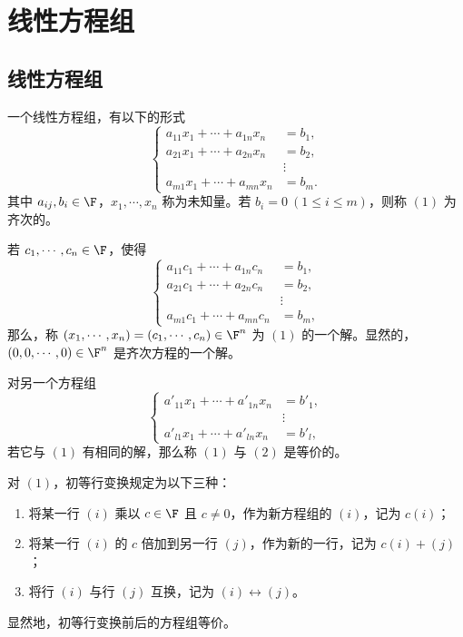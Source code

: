 \setchapterintro{}
\chapter{线性方程组}

\section{线性方程组}
\begin{definition}
	一个线性方程组，有以下的形式
	\begin{equation}\tag{1}
		\left\{
		\begin{aligned}
			a_{11}x_1+\cdots+a_{1n}x_n&=b_1,\\
			a_{21}x_1+\cdots+a_{2n}x_n&=b_2,\\
			&\vdots\\
			a_{m1}x_1+\cdots+a_{mn}x_n&=b_m.
		\end{aligned}
		\right.
	\end{equation}
	其中 $a_{ij},b_i\in\F$，$x_1,\cdots,x_n$ 称为未知量。若 $b_i=0\ (1\leq i\leq m)$，则称 $(1)$ 为齐次的。
	
	若 $c_1,\cdots,c_n\in\F$，使得
	\[
	\left\{
	\begin{aligned}
		a_{11}c_1+\cdots+a_{1n}c_n&=b_1,\\
		a_{21}c_1+\cdots+a_{2n}c_n&=b_2,\\
		&\vdots\\
		a_{m1}c_1+\cdots+a_{mn}c_n&=b_m,
	\end{aligned}
	\right.
	\]
	那么，称 $(x_1,\cdots,x_n)=(c_1,\cdots,c_n)\in\F^n$ 为 $(1)$ 的一个解。显然的，$(0,0,\cdots,0)\in\F^n$ 是齐次方程的一个解。
	
	对另一个方程组
	\begin{equation}\tag{2}
		\left\{
		\begin{aligned}
			a'_{11}x_1+\cdots+a'_{1n}x_n&=b'_1,\\
			&\vdots\\
			a'_{l1}x_1+\cdots+a'_{ln}x_n&=b'_l,
		\end{aligned}
		\right.
	\end{equation}
	若它与 $(1)$ 有相同的解，那么称 $(1)$ 与 $(2)$ 是等价的。
\end{definition}

\begin{definition}
	对 $(1)$，初等行变换规定为以下三种：
	\begin{enumerate}
		\item 将某一行 $(i)$ 乘以 $c\in\F$ 且 $c\neq0$，作为新方程组的 $(i)$，记为 $c(i)$；
		\item 将某一行 $(i)$ 的 $c$ 倍加到另一行 $(j)$，作为新的一行，记为 $c(i)+(j)$；
		\item 将行 $(i)$ 与行 $(j)$ 互换，记为 $(i)\leftrightarrow(j)$。
	\end{enumerate}
	
\end{definition}
显然地，初等行变换前后的方程组等价。



